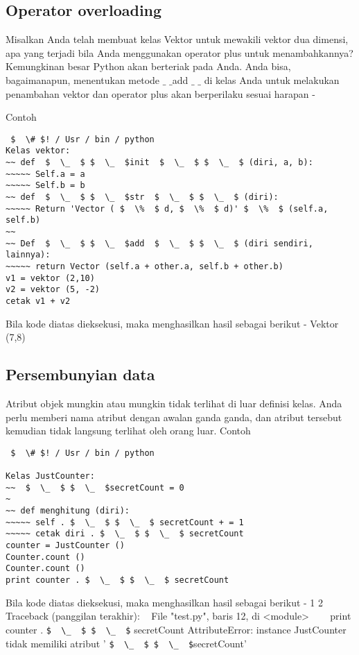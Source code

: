 \subsection{Operator overloading}
Misalkan Anda telah membuat kelas Vektor untuk mewakili vektor dua dimensi, apa yang terjadi bila Anda menggunakan operator plus untuk menambahkannya? Kemungkinan besar Python akan berteriak pada Anda. Anda bisa, bagaimanapun, menentukan metode  $  \_  $ $  \_  $add $  \_  $ $  \_  $ di kelas Anda untuk melakukan penambahan vektor dan operator plus akan berperilaku sesuai harapan - \par
Contoh

\begin{verbatim}
 $  \# $! / Usr / bin / python
Kelas vektor:
~~ def  $  \_  $ $  \_  $init  $  \_  $ $  \_  $ (diri, a, b):
~~~~~ Self.a = a
~~~~~ Self.b = b
~~ def  $  \_  $ $  \_  $str  $  \_  $ $  \_  $ (diri):
~~~~~ Return 'Vector ( $  \%  $ d, $  \%  $ d)' $  \%  $ (self.a, self.b)
~~
~~ Def  $  \_  $ $  \_  $add  $  \_  $ $  \_  $ (diri sendiri, lainnya):
~~~~~ return Vector (self.a + other.a, self.b + other.b)
v1 = vektor (2,10)
v2 = vektor (5, -2)
cetak v1 + v2
\end{verbatim}

Bila kode diatas dieksekusi, maka menghasilkan hasil sebagai berikut -
Vektor (7,8)

\subsection{Persembunyian data}
Atribut objek mungkin atau mungkin tidak terlihat di luar definisi kelas. Anda perlu memberi nama atribut dengan awalan ganda ganda, dan atribut tersebut kemudian tidak langsung terlihat oleh orang luar.
Contoh

\begin {verbatim}
 $  \# $! / Usr / bin / python

Kelas JustCounter:
~~  $  \_  $ $  \_  $secretCount = 0
~
~~ def menghitung (diri):
~~~~~ self . $  \_  $ $  \_  $ secretCount + = 1
~~~~~ cetak diri . $  \_  $ $  \_  $ secretCount
counter = JustCounter ()
Counter.count ()
Counter.count ()
print counter . $  \_  $ $  \_  $ secretCount
\end{verbatim}

Bila kode diatas dieksekusi, maka menghasilkan hasil sebagai berikut -
1
2
Traceback (panggilan terakhir):
~ File "test.py", baris 12, di <module>
~~~ print counter . \verb|$  \_  $ $  \_  $| secretCount
AttributeError: instance JustCounter tidak memiliki atribut ' \verb|$  \_  $ $  \_  $|secretCount'

